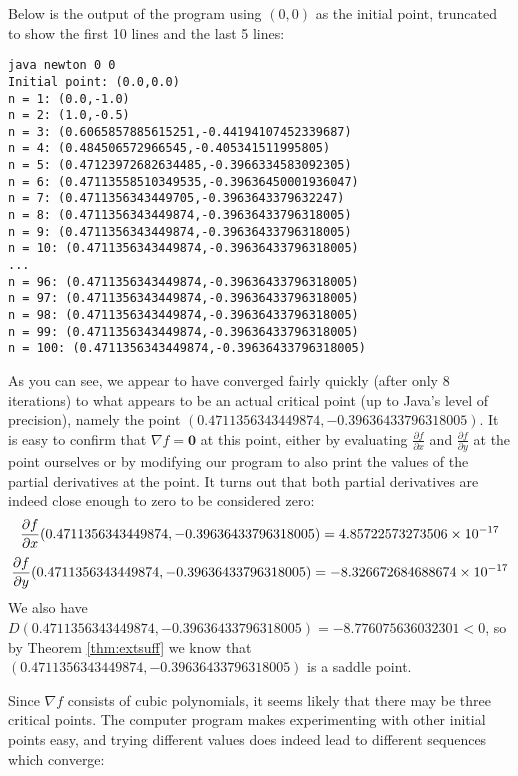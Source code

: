 \begin{exmp}
Below is the output of the program using $(0,0)$ as the initial point, truncated to show the first 10 lines and
the last 5 lines:

\begin{verbatim}
java newton 0 0
Initial point: (0.0,0.0)
n = 1: (0.0,-1.0)
n = 2: (1.0,-0.5)
n = 3: (0.6065857885615251,-0.44194107452339687)
n = 4: (0.484506572966545,-0.405341511995805)
n = 5: (0.47123972682634485,-0.3966334583092305)
n = 6: (0.47113558510349535,-0.39636450001936047)
n = 7: (0.4711356343449705,-0.3963643379632247)
n = 8: (0.4711356343449874,-0.39636433796318005)
n = 9: (0.4711356343449874,-0.39636433796318005)
n = 10: (0.4711356343449874,-0.39636433796318005)
...
n = 96: (0.4711356343449874,-0.39636433796318005)
n = 97: (0.4711356343449874,-0.39636433796318005)
n = 98: (0.4711356343449874,-0.39636433796318005)
n = 99: (0.4711356343449874,-0.39636433796318005)
n = 100: (0.4711356343449874,-0.39636433796318005)
\end{verbatim}

As you can see, we appear to have converged fairly quickly (after only 8 iterations) to what appears to be an actual
critical point (up to Java's level of precision), namely the point
$(0.4711356343449874,-0.39636433796318005)$. It is easy to confirm that $\nabla f = \textbf{0}$ at this point,
either by evaluating $\frac{\partial f}{\partial x}$ and $\frac{\partial f}{\partial y}$ at the point ourselves or by
modifying our program to also print the values of the partial derivatives at the point. It turns out that
both partial derivatives are indeed close enough to zero to be considered zero:
\begin{gather*}
 \frac{\partial f}{\partial x}(0.4711356343449874,-0.39636433796318005) = 4.85722573273506 \times 10^{-17}\smallskip\\
 \frac{\partial f}{\partial y}(0.4711356343449874,-0.39636433796318005) = -8.326672684688674 \times 10^{-17}
\end{gather*}
We also have $D(0.4711356343449874,-0.39636433796318005) = -8.776075636032301 < 0$, so by
Theorem \ref{thm:extsuff} we know that $(0.4711356343449874,-0.39636433796318005)$ is a saddle point.

Since $\nabla f$ consists of cubic polynomials, it seems likely that there may be three critical points.
The computer program makes experimenting with other initial points easy, and trying different values does indeed lead
to different sequences which converge:


\end{exmp}
